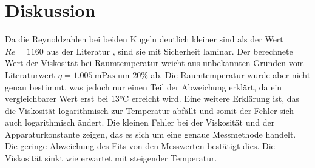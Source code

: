 \section{Diskussion}
\label{sec:Diskussion}
Da die Reynoldzahlen bei beiden Kugeln deutlich kleiner sind als der
Wert $Re=1160$ aus der Literatur \cite{gertzen}, sind sie mit Sicherheit laminar.
Der berechnete Wert der Viskosität bei Raumtemperatur
weicht aus unbekannten Gründen vom Literaturwert $\eta=\SI{1.005}{\meter\pascal\second}$\cite{gertzen}
 um $20\%$ ab.
Die Raumtemperatur wurde aber nicht genau bestimmt, was jedoch nur einen Teil der
Abweichung erklärt, da ein vergleichbarer Wert erst bei $13\si{\celsius}$ erreicht wird.
Eine weitere Erklärung ist, das die Viskosität logarithmisch zur Temperatur abfällt
und somit der Fehler sich auch logarithmisch ändert.
Die kleinen Fehler bei der Viskosität und der Apparaturkonstante zeigen, das
es sich um eine genaue Messmethode handelt. Die geringe Abweichung des Fits von
den Messwerten bestätigt dies. Die Viskosität sinkt wie erwartet mit steigender
Temperatur.
